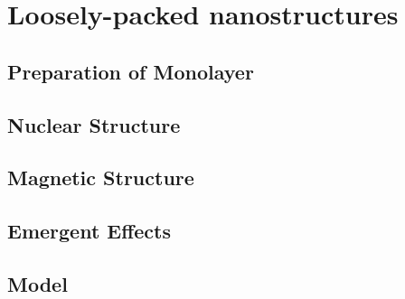 \documentclass[\main/dresen_thesis.tex]{subfiles}
\begin{document}
\chapter{Loosely-packed nanostructures}\label{ch:looselyPackedNS}

\section{Preparation of Monolayer}

\section{Nuclear Structure}

\section{Magnetic Structure}

\section{Emergent Effects}

\section{Model}
\end{document}
